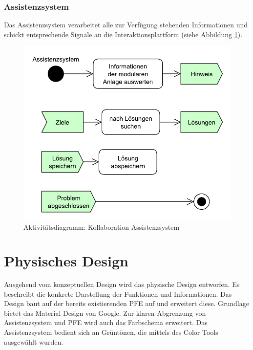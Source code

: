 \subsubsection*{Assistenzsystem}
Das Assistenzsystem verarbeitet alle zur Verfügung stehenden Informationen und schickt entsprechende Signale an die Interaktionsplattform (siehe Abbildung \ref{pic:Kollaboration-Assistenzsystem}).
\begin{figure}[htbp]
\centering
\includegraphics[scale=0.5]{DA_files/UML/Konzept/Aktivitaetsdiagramm-Assistenz.pdf}
\caption{Aktivitätsdiagramm: Kollaboration Assistenzsystem}
\label{pic:Kollaboration-Assistenzsystem}
\end{figure}

\section{Physisches Design}
\label{4:Physikalische-Design}
Ausgehend vom konzeptuellen Design wird das physische Design entworfen. Es beschreibt die konkrete Darstellung der Funktionen und Informationen. Das Design baut auf der bereits existierenden PFE auf und erweitert diese. Grundlage bietet das Material Design \cite{MaterialDesign} von Google. Zur klaren Abgrenzung von Assistenzsystem und PFE wird auch das Farbschema erweitert. Das Assistenzsystem bedient sich an Grüntönen, die mittels des Color Tools \cite{}  ausgewählt wurden.

